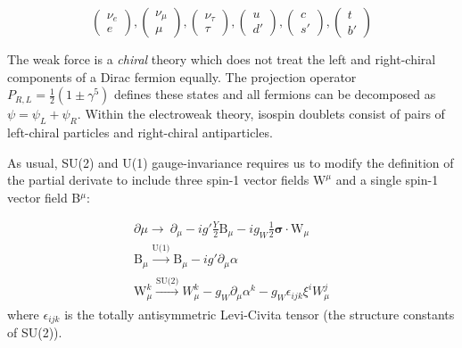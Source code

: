 \begin{equation*}
\begin{pmatrix} \nu_{e} \\ e \end{pmatrix},
\begin{pmatrix} \nu_{\mu} \\ \mu \end{pmatrix},
\begin{pmatrix} \nu_{\tau} \\ \tau \end{pmatrix},
\begin{pmatrix} u \\ d' \end{pmatrix},
\begin{pmatrix} c \\ s' \end{pmatrix},
\begin{pmatrix} t \\ b' \end{pmatrix}
\end{equation*}

The weak force is a \textit{chiral} theory which does not treat the left and right-chiral components of a Dirac fermion equally.  The projection operator $P_{R,L} = \frac{1}{2} ( 1 \pm \gamma^{5})$ defines these states and all fermions can be decomposed as $\psi = \psi_{L} + \psi_{R}$. Within the electroweak theory, isospin doublets consist of pairs of left-chiral particles and right-chiral antiparticles.

As usual, SU(2) and U(1) gauge-invariance requires us to modify the definition of the partial derivate to include three spin-1 vector fields $\bm{\mathrm{W}}^{\mu}$ and a single spin-1 vector field B$^{\mu}$:

\begin{equation}
\begin{array}{l}
\partial{\mu} \rightarrow\ \partial_{\mu} - i g' \frac{Y}{2}\mathrm{B}_{\mu} -  i g_{W} \frac{1}{2}\bm{\sigma} \cdot \bm{\mathrm{W}}_{\mu}\\
\mathrm{B}_{\mu} \xrightarrow[]{\text{U(1)}} \mathrm{B}_{\mu} - i g' \partial_{\mu} \alpha \\
\mathrm{W}^{k}_{\mu} \xrightarrow[]{\text{SU(2)}} W^{k}_{\mu} - g_{W} \partial_{\mu} \alpha^{k} -  g_{W} \epsilon_{ijk} \xi^{i} W^{j}_{\mu}
 \end{array}
\end{equation}
where $\epsilon_{ijk}$ is the totally antisymmetric Levi-Civita tensor (the structure constants of SU(2)).

